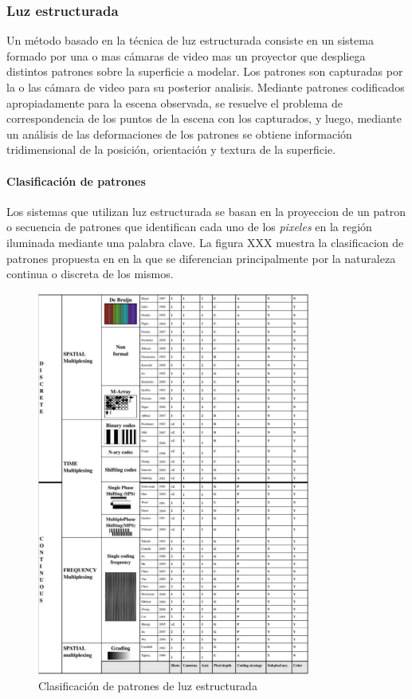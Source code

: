 \subsubsection{Luz estructurada}

Un método basado en la técnica de luz estructurada consiste en un sistema formado por una o mas cámaras de video mas un proyector que despliega distintos patrones sobre la superficie a modelar. Los patrones son capturadas por la o las cámara de video para su posterior analisis. Mediante patrones codificados apropiadamente para la escena observada, se resuelve el problema de correspondencia de los puntos de la escena con los capturados, y luego, mediante un análisis de las deformaciones de los patrones se obtiene información tridimensional de la posición, orientación y textura de la superficie\cite{SLightPatterns}.

\paragraph{Clasificación de patrones}

Los sistemas que utilizan luz estructurada se basan en la proyeccion de un patron o secuencia de patrones que identifican cada uno de los \emph{pixeles} en la región iluminada mediante una palabra clave. 
La figura XXX muestra la clasificacion de patrones propuesta en \cite{SLightClassification} en la que se diferencian principalmente por la naturaleza continua o discreta de los mismos. 

\begin{figure}[H]
  \centering
    \includegraphics[width=0.8\textwidth]{./Cap2_videomapping/SL-patternclassiff.png}
  \caption{Clasificación de patrones de luz estructurada \cite{SLightClassification}}
  \label{fig:SLPatternClassification}
\end{figure}

